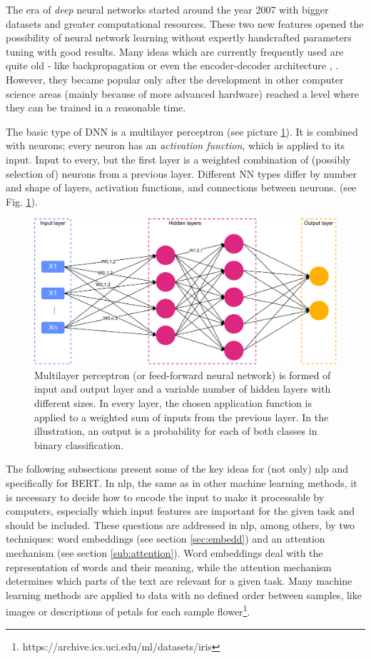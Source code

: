 The era of \textit{deep} neural networks started around the year 2007 \citep{Goodfellow-et-al-2016} with bigger datasets and greater computational resources. These two new features opened the possibility of neural network learning without expertly handcrafted parameters tuning with good results.
Many ideas which are currently frequently used are quite old - like backpropagation \citep{Rumelhart} or even the encoder-decoder architecture \citep{Allen19}, \citep{Forcada1997}. However, they became popular only after the development in other computer science areas (mainly because of more advanced hardware) reached a level where they can be trained in a reasonable time.
\par
The basic type of DNN is a multilayer perceptron (see picture \ref{pic:multilayer}).
It is combined with neurons; every neuron has an \textit{activation function}, which is applied to its input. Input to every, but the first layer is a weighted combination of (possibly selection of) neurons from a previous layer. 
Different NN types differ by number and shape of layers, activation functions, and connections between neurons. (see Fig. \ref{pic:multilayer}).
\begin{figure}[H]
\centering
\includegraphics[width=1\columnwidth]{../img/multilayer}
\caption{Multilayer perceptron (or feed-forward neural network) is formed of input and output layer and a variable number of hidden layers with different sizes. In every layer, the chosen application function is applied to a weighted sum of inputs from the previous layer. In the illustration, an output is a probability for each of both classes in binary classification.}
\label{pic:multilayer}
\end{figure}
\par
The following subsections present some of the key ideas for (not only) \acrshort{nlp} and specifically for BERT. In \acrshort{nlp}, the same as in other machine learning methods, it is necessary to decide how to encode the input to make it processable by computers, especially which input features are important for the given task and should be included. These questions are addressed in \acrshort{nlp}, among others, by two techniques: word embeddings (see section \ref{sec:embedd}) and an attention mechanism (see section \ref{sub:attention}). Word embeddings deal with the representation of words and their meaning, while the attention mechanism determines which parts of the text are relevant for a given task. Many machine learning methods are applied to data with no defined order between samples, like images or descriptions of petals for each sample flower\footnote{https://archive.ics.uci.edu/ml/datasets/iris}.
